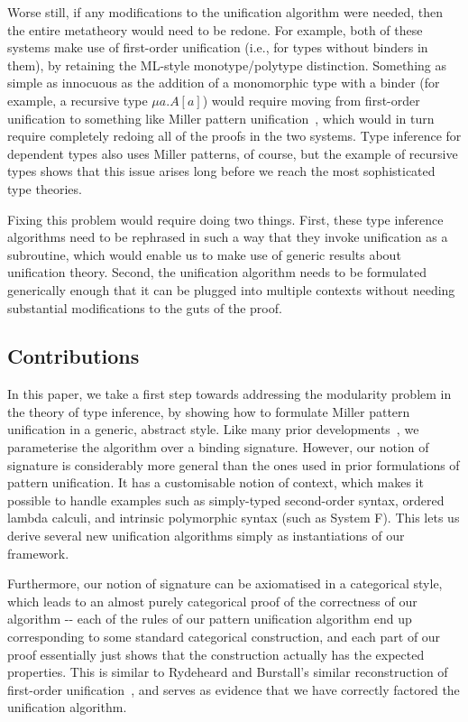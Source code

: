 Worse still, if any modifications to the unification algorithm were
needed, then the entire metatheory would need to be redone. For example,
both of these systems make use of first-order unification (i.e., for
types without binders in them), by retaining the ML-style monotype/polytype
distinction. Something as simple as innocuous as the addition of a
monomorphic type with a binder (for example, a recursive type $\mu a.A[a]$)
would require moving from first-order unification to something like
Miller pattern unification~\citet{DBLP:journals/logcom/Miller91},
which would in turn require completely redoing all of the proofs in
the two systems. Type inference for dependent types also uses Miller
patterns, of course, but the example of recursive types shows that
this issue arises long before we reach the most sophisticated type
theories.

Fixing this problem would require doing two things. First, these type
inference algorithms need to be rephrased in such a way that they
invoke unification as a subroutine, which would enable us to make
use of generic results about unification theory. Second, the unification
algorithm needs to be formulated generically enough that it can be
plugged into multiple contexts without needing substantial modifications
to the guts of the proof. 


\subsection*{Contributions}

In this paper, we take a first step towards addressing the modularity
problem in the theory of type inference, by showing how to formulate
Miller pattern unification in a generic, abstract style. Like many
prior developments~\citet{10.1007/978-3-540-45220-1_41}, we parameterise
the algorithm over a binding signature. However, our notion of signature
is considerably more general than the ones used in prior formulations
of pattern unification. It has a customisable notion of context, which
makes it possible to handle examples such as simply-typed second-order
syntax, ordered lambda calculi, and intrinsic polymorphic syntax (such
as System F). This lets us derive several new unification algorithms
simply as instantiations of our framework. 

Furthermore, our notion of signature can be axiomatised in a categorical
style, which leads to an almost purely categorical proof of the correctness
of our algorithm -{}- each of the rules of our pattern unification
algorithm end up corresponding to some standard categorical construction,
and each part of our proof essentially just shows that the construction
actually has the expected properties. This is similar to Rydeheard
and Burstall's similar reconstruction of first-order unification~\citet{DBLP:books/daglib/0068768},
and serves as evidence that we have correctly factored the unification
algorithm.

